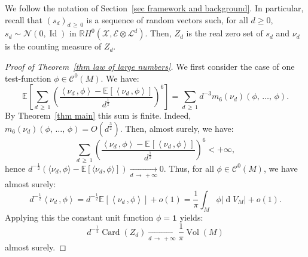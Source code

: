 \documentclass[AHL,Unicode,longabstracts,published]{cedram}
\DeclareMathOperator{\card}{Card}
\DeclareMathOperator{\dmesure}{d}
\DeclareMathOperator{\Id}{Id}
\DeclareMathOperator{\Vol}{Vol}
\newcommand{\E}{\mathcal{E}}
\newcommand{\X}{\mathcal{X}}
\renewcommand{\L}{\mathcal{L}}
\newcommand{\clN}{\mathcal{N}}
\newcommand{\clC}{\mathcal{C}}
\newcommand{\R}{\mathbb{R}}
\newcommand{\bbE}{\mathbb{E}}
\newcommand{\bfun}{\mathbf{1}}
\newcommand{\esp}[2][]{\mathbb{E}_{#1}\!\left[#2 \right]}
\newcommand{\norm}[1]{\left\lvert #1 \right\rvert}
\newcommand{\prsc}[2]{\left\langle #1\,, #2 \right\rangle}
\newcommand{\rmes}[1]{\norm{\dmesure\! V_{#1}}}
\newcommand{\vol}[1]{\Vol\!\left(#1\right)}
\renewcommand{\H}{H^0(\X,\E \otimes \L^d)}
\renewcommand{\geq}{\geqslant}
\begin{document}
We follow the notation of Section~\ref{sec framework and background}. In particular, recall that $(s_d)_{d\,\geq\,0}$ is a sequence of random vectors such, for all $d \geq 0$, $s_d \sim \clN(0,\Id)$ in $\R\H$. Then, $Z_d$ is the real zero set of $s_d$ and $\nu_d$ is the counting measure of $Z_d$.

\begin{proof}[Proof of Theorem~\ref{thm law of large numbers}]
We first consider the case of one test-function $\phi \in \clC^0(M)$. We have:
\[
\esp{\sum_{d\,\geq\,1} \left(\frac{\prsc{\nu_d}{\phi} - \esp{\prsc{\nu_d}{\phi}}}{d^\frac{1}{2}}\right)^6} = \sum_{d \,\geq\,1} d^{-3} m_6(\nu_d)(\phi,\,\dots,\,\phi).
\]
By Theorem~\ref{thm main} this sum is finite. Indeed, $m_6(\nu_d)(\phi,\,\dots,\,\phi) = O(d^\frac{3}{2})$. Then, almost surely, we have:
\[
\sum_{d\,\geq\,1} \left(\frac{\prsc{\nu_d}{\phi} - \esp{\prsc{\nu_d}{\phi}}}{d^\frac{1}{2}}\right)^6 < +\infty,
\]
hence $d^{-\frac{1}{2}}(\langle\nu_d, \phi\rangle -  \bbE[\langle\nu_d,\phi\rangle]) \xrightarrow[d\,\to\,+\infty]{} 0$. Thus, for all $\phi \in \clC^0(M)$, we have almost surely:
\[
d^{-\frac{1}{2}} \prsc{\nu_d}{\phi} = d^{-\frac{1}{2}} \esp{\prsc{\nu_d}{\phi}} + o(1) = \frac{1}{\pi} \int_M \phi \rmes{M} + o(1).
\]
Applying this the constant unit function $\phi=\bfun$ yields: \[
d^{-\frac{1}{2}}\card(Z_d) \xrightarrow[d\,\to\,+\infty]{} \frac{1}{\pi}\vol{M}
\]
almost surely.


\end{proof}
\end{document}
